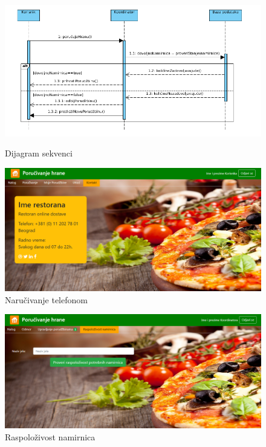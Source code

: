 \begin{figure}[!h]
    \includegraphics[width=1\textwidth]{slike/DijagramSekvenci.png}\\
    \caption{Dijagram sekvenci}
\end{figure}
\newpage
\begin{figure}[!h]
    \includegraphics[width=1\textwidth]{slike/kontakt.png}
    \caption{Naručivanje telefonom} %
    \label{fig:slika_kontakt}
\end{figure}
\begin{figure}[!h]
    \includegraphics[width=1\textwidth]{slike/raspolozivost_namirnica.png}
    \caption{Raspolo\v zivost namirnica} %
    \label{fig:slika_kontakt}
\end{figure}
